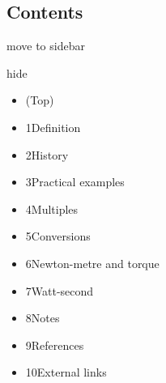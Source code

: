 \documentclass[
]{article}
\providecommand{\tightlist}{%
  \setlength{\itemsep}{0pt}\setlength{\parskip}{0pt}}
\begin{document}
\label{siteNotice}

\label{mw-navigation}
\label{vector-main-menu-pinned-container}

\label{vector-toc-pinned-container}
\label{vector-toc}
\subsection{Contents}\label{contents}

move to sidebar

hide

\begin{itemize}
\tightlist
\item
  \label{toc-mw-content-text}{\hyperref[]{}}

  (Top)
\item
  \label{toc-Definition}{\hyperref[Definition]{}}

  {1}Definition
\item
  \label{toc-History}{\hyperref[History]{}}

  {2}History
\item
  \label{toc-Practical_examples}{\hyperref[Practical_examples]{}}

  {3}Practical examples
\item
  \label{toc-Multiples}{\hyperref[Multiples]{}}

  {4}Multiples
\item
  \label{toc-Conversions}{\hyperref[Conversions]{}}

  {5}Conversions
\item
  \label{toc-Newton-metre_and_torque}{\hyperref[Newton-metre_and_torque]{}}

  {6}Newton-metre and torque
\item
  \label{toc-Watt-second}{\hyperref[Watt-second]{}}

  {7}Watt-second
\item
  \label{toc-Notes}{\hyperref[Notes]{}}

  {8}Notes
\item
  \label{toc-References}{\hyperref[References]{}}

  {9}References
\item
  \label{toc-External_links}{\hyperref[External_links]{}}

  {10}External links
\end{itemize}
\end{document}
